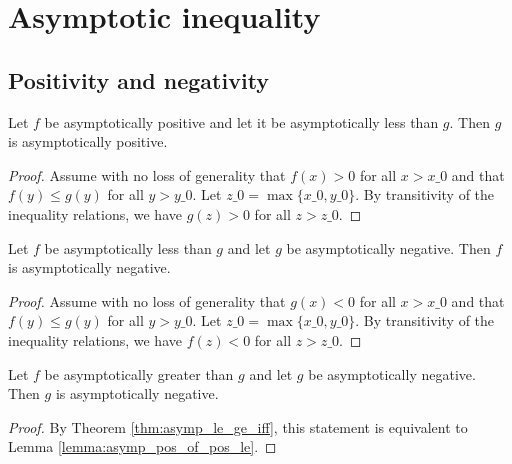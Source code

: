 \section{Asymptotic inequality}

\subsection{Positivity and negativity}

\begin{lemma}
    \label{lemma:asymp_pos_of_pos_le}
    \leanok
    Let $f$ be asymptotically positive and let it be asymptotically less than $g$.
    Then $g$ is asymptotically positive.
\end{lemma}

\begin{proof}
    \leanok
    Assume with no loss of generality that $f(x) > 0$ for all $x > x\_0$ and that
    $f(y) \le g(y)$ for all $y > y\_0$. Let $z\_0 = \max \{ x\_0, y\_0 \}$. By transitivity
    of the inequality relations, we have $g(z) > 0$ for all $z > z\_0$. 
\end{proof}

\begin{lemma}
    \label{lemma:asymp_neg_of_le_neg}
    \leanok
    Let $f$ be asymptotically less than $g$ and let $g$ be asymptotically negative.
    Then $f$ is asymptotically negative.
\end{lemma}

\begin{proof}
    \leanok
    Assume with no loss of generality that $g(x) < 0$ for all $x > x\_0$ and that
    $f(y) \le g(y)$ for all $y > y\_0$. Let $z\_0 = \max \{ x\_0, y\_0 \}$. By transitivity
    of the inequality relations, we have $f(z) < 0$ for all $z > z\_0$. 
\end{proof}

\begin{lemma}
    \label{lemma:asymp_pos_of_ge_pos}
    \leanok
    Let $f$ be asymptotically greater than $g$ and let $g$ be asymptotically negative.
    Then $g$ is asymptotically negative.
\end{lemma}

\begin{proof}
    \leanok
    By Theorem \ref{thm:asymp_le_ge_iff}, this statement is equivalent to Lemma
    \ref{lemma:asymp_pos_of_pos_le}.
\end{proof}

